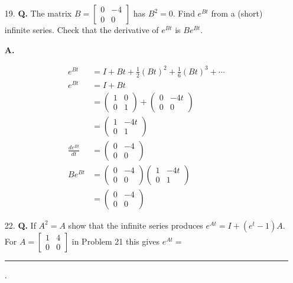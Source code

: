 \documentclass[main.tex]{subfiles}
\begin{document}
\begin{enumerate}
    \item [19.] \textbf{Q.} The matrix $B=\left[\begin{array}{lr}0 & -4 \\ 0 & 0\end{array}\right]$ has $B^{2}=0$. Find $e^{B t}$ from a (short) infinite series. Check that the derivative of $e^{B t}$ is $B e^{B t}$. 
    
    \textbf{A.}

    $$
    \begin{aligned}
    e^{B t}&=I+B t+\frac{1}{2}(B t)^{2}+\frac{1}{6}(B t)^{3}+\cdots\\
    e^{B t} &=I+B t \\
    &=\left(\begin{array}{cc}
    1 & 0 \\
    0 & 1
    \end{array}\right)+\left(\begin{array}{cc}
    0 & -4 t \\
    0 & 0
    \end{array}\right) \\
    &=\left(\begin{array}{cc}
    1 & -4 t \\
    0 & 1
    \end{array}\right)\\
    \frac{d e^{B t}}{d t}&=\left(\begin{array}{cc}
    0 & -4 \\
    0 & 0
    \end{array}\right)\\
    B e^{B t} &=\left(\begin{array}{cc}
    0 & -4 \\
    0 & 0
    \end{array}\right)\left(\begin{array}{cc}
    1 & -4 t \\
    0 & 1
    \end{array}\right) \\
    &=\left(\begin{array}{cc}
    0 & -4 \\
    0 & 0
    \end{array}\right)
    \end{aligned}
    $$
    
    \item [22.] \textbf{Q.} If $A^{2}=A$ show that the infinite series produces $e^{A t}=I+\left(e^{t}-1\right) A$. For $A=\left[\begin{array}{ll}1 & 4 \\ 0 & 0\end{array}\right]$ in Problem 21 this gives $e^{A t}=$ \rule{1cm}{0.15mm}.
    

\end{enumerate}
\end{document}
